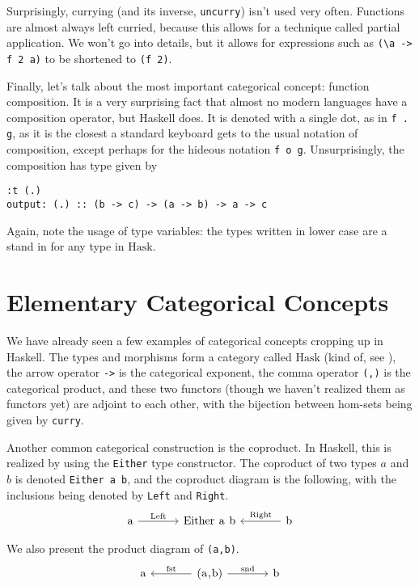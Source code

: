 \documentclass[11pt]{article}
\theoremstyle{nonumberplain}
\newcommand{\Hask}{\mathrm{Hask}}
\newcommand*\lsin{\lstinline}
\newcommand*\lsmath[1]{\text{\lstinline|#1|}}
\begin{document}
Surprisingly, currying (and its inverse, \lsin|uncurry|) isn't used very often. Functions are almost always left curried, because this allows for a technique called partial application. We won't go into details, but it allows for expressions such as \lsin|(\a -> f 2 a)| to be shortened to \lsin|(f 2)|.

Finally, let's talk about the most important categorical concept: function composition. It is a very surprising fact that almost no modern languages have a composition operator, but Haskell does. It is denoted with a single dot, as in \lsin|f . g|, as it is the closest a standard keyboard gets to the usual notation of composition, except perhaps for the hideous notation \lsin|f o g|. Unsurprisingly, the composition has type given by
\begin{lstlisting}
:t (.)
output: (.) :: (b -> c) -> (a -> b) -> a -> c
\end{lstlisting}

Again, note the usage of type variables: the types written in lower case are a stand in for any type in $\Hask$.


\section{Elementary Categorical Concepts}

We have already seen a few examples of categorical concepts cropping up in Haskell. The types and morphisms form a category called $\Hask$ (kind of, see \cite{haskisnotcat}), the arrow operator \lsin|->| is the categorical exponent, the comma operator \lsin|(,)| is the categorical product, and these two functors (though we haven't realized them as functors yet) are adjoint to each other, with the bijection between hom-sets being given by \lsin|curry|.

Another common categorical construction is the coproduct. In Haskell, this is realized by using the \lsin|Either| type constructor. The coproduct of two types $a$ and $b$ is denoted \lsin|Either a b|, and the coproduct diagram is the following, with the inclusions being denoted by \lsin|Left| and \lsin|Right|.
\begin{equation}
\begin{tikzcd}[column sep = large]
\lsmath{a} \arrow[r, "\lsmath{Left}"] & \lsmath{Either a b} & \lsmath{b} \arrow[l, "\lsmath{Right}"']
\end{tikzcd}
\end{equation}

We also present the product diagram of \lsin|(a,b)|.
\begin{equation}
\begin{tikzcd}[column sep=large]
\lsmath{a} & \lsmath{(a,b)} \arrow[l, "\lsmath{fst}"'] \arrow[r, "\lsmath{snd}"] & \lsmath{b} 
\end{tikzcd}
\end{equation}
\end{document}
